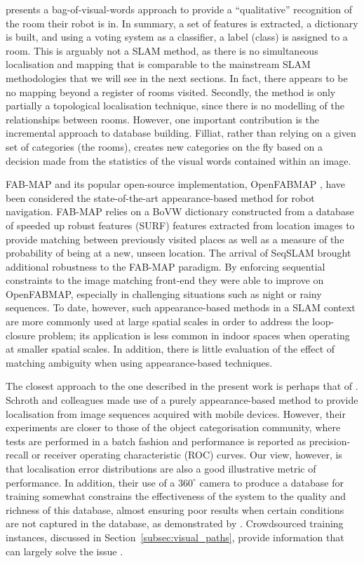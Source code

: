 \citet{filliat2007visual} presents a bag-of-visual-words approach to provide a ``qualitative'' recognition of the room their robot is in. In summary, a set of features is extracted, a dictionary is built, and using a voting system as a classifier, a label (class) is assigned to a room. This is arguably not a SLAM method, as there is no simultaneous localisation and mapping that is comparable to the mainstream SLAM methodologies that we will see in the next sections. In fact, there appears to be no mapping beyond a register of rooms visited. Secondly, the method is only partially a topological localisation technique, since there is no modelling of the relationships between rooms. However, one important contribution is the incremental approach to database building. Filliat, rather than relying on a given set of categories (the rooms), creates new categories on the fly based on a decision made from the statistics of the visual words contained within an image.

FAB-MAP \citep{cumminsFabMap2010} and its popular open-source implementation, OpenFABMAP \citep{OpenFabMap2011}, have been considered the state-of-the-art appearance-based method for robot navigation. FAB-MAP relies on a BoVW dictionary constructed from a database of speed\-ed up robust features (SURF) features extracted from location images to provide matching between previously visited places as well as a measure of the probability of being at a new, unseen location. The arrival of SeqSLAM \citep{milford2012seqslam} brought additional robustness to the FAB-MAP paradigm. By enforcing sequential constraints to the image matching front-end they were able to improve on OpenFABMAP, especially in challenging situations such as night or rainy sequences. To date, however, such appearance-based methods in a SLAM context are more commonly used at large spatial scales in order to address the loop-closure problem; its application is less common in indoor spaces when operating at smaller spatial scales. In addition, there is little evaluation of the effect of matching ambiguity when using appearance-based techniques. 

The closest approach to the one described in the present work is perhaps that of \citet{schroth2011mobile}. Schroth and colleagues made use of a purely appearance-based method to provide localisation from image sequences acquired with mobile devices.  However, their experiments are closer to those of the object categorisation community, where tests are performed in a batch fashion and performance is reported as precision-recall or receiver  operating characteristic (ROC) curves. Our view, however, is that localisation error distributions are also a good illustrative metric of performance.  In addition, their use of a $360^{\circ}$ camera to produce a database for training somewhat constrains the effectiveness of the system to the quality and richness of this database, almost ensuring poor results when certain conditions are not captured in the database, as demonstrated by \citet{milford2012seqslam}. Crowdsourced training instances, discussed in Section~\ref{subsec:visual_paths}, provide information that can largely solve the issue \citep{RiveraWearable}. 

